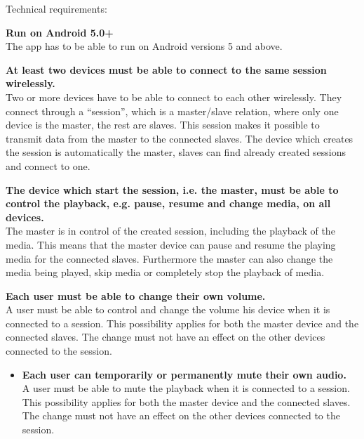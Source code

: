 

Technical requirements:

\begin{eletterate}
    \item \textbf{Run on Android 5.0+} \hfill\\
        The app has to be able to run on Android versions 5 and above.

    \item \textbf{At least two devices must be able to connect to the same session wirelessly.} \hfill\\
        Two or more devices have to be able to connect to each other wirelessly.
        They connect through a ``session'', which is a master/slave relation, where only one device is the master, the rest are slaves.
        This session makes it possible to transmit data from the master to the connected slaves.
        The device which creates the session is automatically the master, slaves can find already created sessions and connect to one.

    \item \textbf{The device which start the session, i.e. the master, must be able to control the playback, e.g. pause, resume and change media, on all devices.} \hfill\\
        The master is in control of the created session, including the playback of the media.
        This means that the master device can pause and resume the playing media for the connected slaves.
        Furthermore the master can also change the media being played, skip media or completely stop the playback of media.

    \item \textbf{Each user must be able to change their own volume.} \hfill\\
        A user must be able to control and change the volume his device when it is connected to a session.
        This possibility applies for both the master device and the connected slaves.
        The change must not have an effect on the other devices connected to the session.

    \begin{itemize}
        \item \textbf{Each user can temporarily or permanently mute their own audio.} \hfill\\
            A user must be able to mute the playback when it is connected to a session.
            This possibility applies for both the master device and the connected slaves.
            The change must not have an effect on the other devices connected to the session.
        

\end{itemize}
\end{eletterate}
